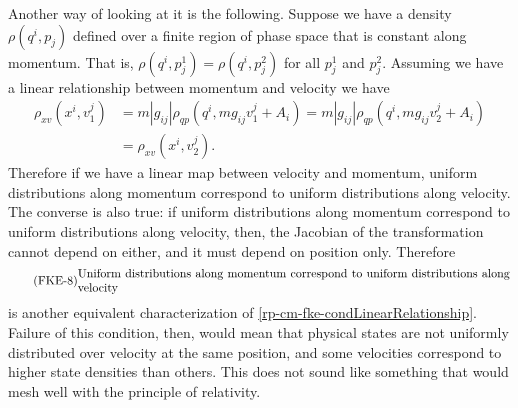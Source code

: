 Another way of looking at it is the following. Suppose we have a density $\rho(q^i, p_j)$ defined over a finite region of phase space that is constant along momentum. That is, $\rho(q^i, p^1_j) = \rho(q^i, p^2_j)$ for all $p^1_j$ and $p^2_j$. Assuming we have a linear relationship between momentum and velocity we have
\begin{equation}
	\begin{aligned}
		\rho_{xv}(x^i, v_1^j) &= m |g_{ij}| \rho_{qp}(q^i, m g_{ij}v_1^j + A_i) = m |g_{ij}| \rho_{qp}(q^i, m g_{ij}v_2^j + A_i) \\
		&= \rho_{xv}(x^i, v_2^j).
	\end{aligned}
\end{equation}
Therefore if we have a linear map between velocity and momentum, uniform distributions along momentum correspond to uniform distributions along velocity. The converse is also true: if uniform distributions along momentum correspond to uniform distributions along velocity, then, the Jacobian of the transformation cannot depend on either, and it must depend on position only. Therefore
\begin{equation}
	\tag{FKE-8}\label{rp-cm-fke-condUniformDistributions}
	\parbox{5in}{Uniform distributions along momentum correspond to uniform distributions along velocity}
\end{equation}
is another equivalent characterization of \ref{rp-cm-fke-condLinearRelationship}. Failure of this condition, then, would mean that physical states are not uniformly distributed over velocity at the same position, and some velocities correspond to higher state densities than others. This does not sound like something that would mesh well with the principle of relativity.

